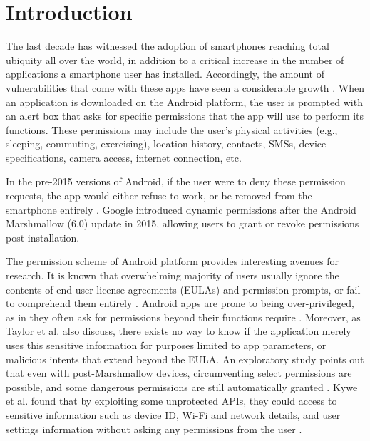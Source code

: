 \documentclass[
  a4paper,  %
  twoside,  %
  bibliography=totoc,
  headsepline,
  cleardoublepage=empty,
  parskip=half,
  draft=false,
  open=any
]{scrbook}
\begin{document}
\chapter{Introduction}

The last decade has witnessed the adoption of smartphones reaching total ubiquity all over the world, in addition to a critical increase in the number of applications a smartphone user has installed. Accordingly, the amount of vulnerabilities that come with these apps have seen a considerable growth \cite{huang2015}. When an application is downloaded on the Android platform, the user is prompted with an alert box that asks for specific permissions that the app will use to perform its functions. These permissions may include the user's physical activities (e.g., sleeping, commuting, exercising), location history, contacts, SMSs, device specifications, camera access, internet connection, etc. 

In the pre-2015 versions of Android, if the user were to deny these permission requests, the app would either refuse to work, or be removed from the smartphone entirely \cite{taylor2014}. Google introduced dynamic permissions after the Android Marshmallow (6.0) update in 2015, allowing users to grant or revoke permissions post-installation.

The permission scheme of Android platform provides interesting avenues for research. It is known that overwhelming majority of users usually ignore the contents of end-user license agreements (EULAs) and permission prompts, or fail to comprehend them entirely \cite{felt2012}. Android apps are prone to being over-privileged, as in they often ask for permissions beyond their functions require \cite{xiao2020}. Moreover, as Taylor et al. also discuss,  there exists no way to know if the application merely uses this sensitive information for purposes limited to app parameters, or malicious intents that extend beyond the EULA. An exploratory study points out that even with post-Marshmallow devices, circumventing select permissions are possible, and some dangerous permissions are still automatically granted \cite{alepis2017}. Kywe et al. found that by exploiting some unprotected APIs, they could access to sensitive information such as device ID, Wi-Fi and network details, and user settings information without asking any permissions from the user \cite{kywe2016}.
\end{document}
